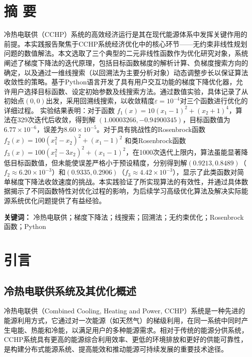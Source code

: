 \documentclass[12pt]{article} %
\begin{document}
\newpage


\section*{摘 要}
\noindent 冷热电联供（CCHP）系统的高效经济运行是其在现代能源体系中发挥关键作用的前提。本实践报告聚焦于CCHP系统经济优化中的核心环节——无约束非线性规划问题的数值解法。本文选取了三个典型的二元非线性函数作为优化研究对象，系统阐述了梯度下降法的迭代原理，包括目标函数梯度的解析计算、负梯度搜索方向的确定，以及通过一维线搜索（以回溯法为主要分析对象）动态调整步长以保证算法收敛性的策略。基于Python语言开发了具有用户交互功能的梯度下降优化器，允许用户选择目标函数、设定初始参数及线搜索方法。通过数值实验，具体记录了从初始点\((0,0)\)出发，采用回溯线搜索，以收敛精度\(\varepsilon=10^{-4}\)对三个函数进行优化的详细过程。
实验结果表明：对于函数 \(f_1(x) = 10(x_1-1)^2 + (x_2+1)^4\)，算法在329次迭代后收敛，得到解 \((1.00003266, -0.94900345)\)，目标函数值为\(6.77 \times 10^{-6}\)，误差为\(8.60 \times 10^{-5}\)。对于具有挑战性的Rosenbrock函数 \(f_2(x) = 100(x_1^2-x_2)^2 + (x_1-1)^2\) 和类Rosenbrock函数 \(f_3(x) = 100(x_1^2-3x_2)^2 + (x_1-1)^2\)，在1000次迭代上限内，算法虽能显著降低目标函数值，但未能使误差严格小于预设精度，分别得到解\((0.9213, 0.8489)\)（\(f_2 \approx 6.20 \times 10^{-3}\)）和\((0.9335, 0.2906)\)（\(f_3 \approx 4.42 \times 10^{-3}\)），显示了此类函数对简单梯度下降法收敛速度的挑战。本实践验证了所实现算法的有效性，并通过具体数据揭示了不同函数特性对优化过程的影响，为后续学习高级优化算法及解决实际能源系统优化问题提供了有益经验。

\vspace{1.5em}
\noindent \textbf{关键词：} 冷热电联供；梯度下降法；线搜索；回溯法；无约束优化；Rosenbrock函数；Python
\newpage

\tableofcontents
{}
\newpage

\section{引言}
\subsection{冷热电联供系统及其优化概述}
冷热电联供（Combined Cooling, Heating and Power, CCHP）系统是一种先进的能源利用方式，它通过对一次能源（如天然气）的梯级利用，在同一系统中同时产生电能、热能和冷能，以满足用户的多种能源需求。相对于传统的能源分供系统，CCHP系统具有更高的能源综合利用效率、更低的环境排放和更好的供能可靠性，是构建分布式能源系统、提高能效和推动能源可持续发展的重要技术途径。
\end{document}
